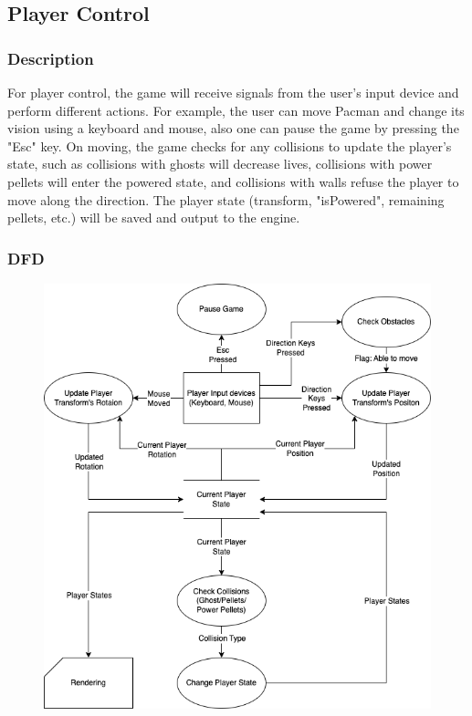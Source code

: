 \documentclass[11pt]{article}
\begin{document}
\subsection{Player Control}
\subsubsection{Description}
\par For player control, the game will receive signals from the user's input device and perform different actions. For example, the user can move Pacman and change its vision using a keyboard and mouse, also one can pause the game by pressing the "Esc" key. On moving, the game checks for any collisions to update the player's state, such as collisions with ghosts will decrease lives, collisions with power pellets will enter the powered state, and collisions with walls refuse the player to move along the direction. The player state (transform, "isPowered", remaining pellets, etc.) will be saved and output to the engine.
\subsubsection{DFD}
\begin{figure}[H]
    \centering
    \includegraphics*[scale=0.4]{PlayerControl_DFD.png}
\end{figure}
\end{document}

